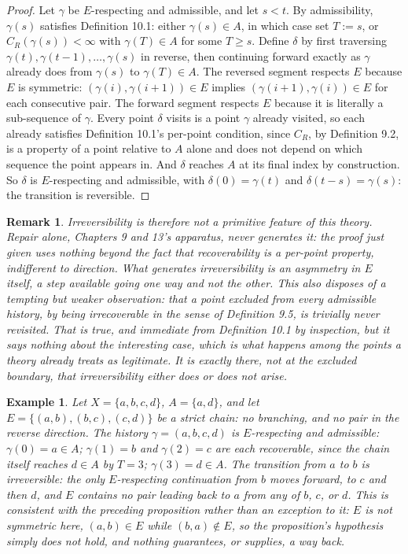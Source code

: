 \documentclass[11pt]{book}
\newtheorem*{appendixremark}{Remark}
\newtheorem*{appendixexample}{Example}
\begin{document}
\begin{proof}
Let $\gamma$ be $E$-respecting and admissible, and let $s < t$. By admissibility, $\gamma(s)$ satisfies Definition 10.1: either $\gamma(s) \in A$, in which case set $T := s$, or $C_R(\gamma(s)) < \infty$ with $\gamma(T) \in A$ for some $T \geq s$. Define $\delta$ by first traversing $\gamma(t), \gamma(t-1), \dots, \gamma(s)$ in reverse, then continuing forward exactly as $\gamma$ already does from $\gamma(s)$ to $\gamma(T) \in A$. The reversed segment respects $E$ because $E$ is symmetric: $(\gamma(i), \gamma(i+1)) \in E$ implies $(\gamma(i+1), \gamma(i)) \in E$ for each consecutive pair. The forward segment respects $E$ because it is literally a sub-sequence of $\gamma$. Every point $\delta$ visits is a point $\gamma$ already visited, so each already satisfies Definition 10.1's per-point condition, since $C_R$, by Definition 9.2, is a property of a point relative to $A$ alone and does not depend on which sequence the point appears in. And $\delta$ reaches $A$ at its final index by construction. So $\delta$ is $E$-respecting and admissible, with $\delta(0) = \gamma(t)$ and $\delta(t-s) = \gamma(s)$: the transition is reversible.
\end{proof}

\begin{appendixremark}
Irreversibility is therefore not a primitive feature of this theory. Repair alone, Chapters 9 and 13's apparatus, never generates it: the proof just given uses nothing beyond the fact that recoverability is a per-point property, indifferent to direction. What generates irreversibility is an asymmetry in $E$ itself, a step available going one way and not the other. This also disposes of a tempting but weaker observation: that a point excluded from every admissible history, by being irrecoverable in the sense of Definition 9.5, is trivially never revisited. That is true, and immediate from Definition 10.1 by inspection, but it says nothing about the interesting case, which is what happens \emph{among} the points a theory already treats as legitimate. It is exactly there, not at the excluded boundary, that irreversibility either does or does not arise.
\end{appendixremark}

\begin{appendixexample}
Let $X = \{a,b,c,d\}$, $A = \{a,d\}$, and let $E = \{(a,b),(b,c),(c,d)\}$ be a strict chain: no branching, and no pair in the reverse direction. The history $\gamma = (a,b,c,d)$ is $E$-respecting and admissible: $\gamma(0) = a \in A$; $\gamma(1) = b$ and $\gamma(2) = c$ are each recoverable, since the chain itself reaches $d \in A$ by $T = 3$; $\gamma(3) = d \in A$. The transition from $a$ to $b$ is irreversible: the only $E$-respecting continuation from $b$ moves forward, to $c$ and then $d$, and $E$ contains no pair leading back to $a$ from any of $b$, $c$, or $d$. This is consistent with the preceding proposition rather than an exception to it: $E$ is not symmetric here, $(a,b) \in E$ while $(b,a) \notin E$, so the proposition's hypothesis simply does not hold, and nothing guarantees, or supplies, a way back.
\end{appendixexample}
\end{document}
